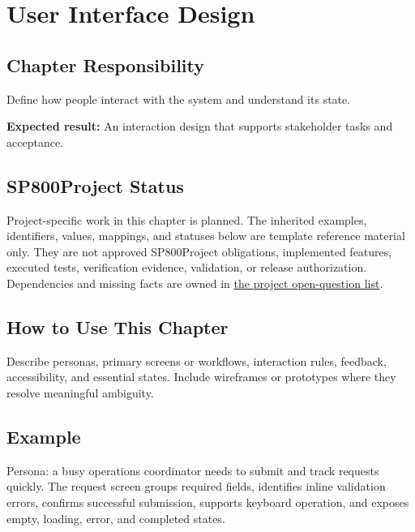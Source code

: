 \chapter{User Interface Design}
\section{Chapter Responsibility}
\label{Section:UserInterfaceDesignResponsibility}
Define how people interact with the system and understand its state.

\noindent\textbf{Expected result:} An interaction design that supports stakeholder tasks and acceptance.

\section{SP800Project Status}
\label{Section:SP800StatusUserInterfaceDesign}
Project-specific work in this chapter is planned. The inherited examples,
identifiers, values, mappings, and statuses below are template reference
material only. They are not approved SP800Project obligations, implemented features,
executed tests, verification evidence, validation, or release authorization.
Dependencies and missing facts are owned in
\hyperref[Section:SP800OpenQuestions]{the project open-question list}.

\section{How to Use This Chapter}
Describe personas, primary screens or workflows, interaction rules, feedback, accessibility, and essential states. Include wireframes or prototypes where they resolve meaningful ambiguity.
\section{Example}
Persona: a busy operations coordinator needs to submit and track requests quickly. The request screen groups required fields, identifies inline validation errors, confirms successful submission, supports keyboard operation, and exposes empty, loading, error, and completed states.
